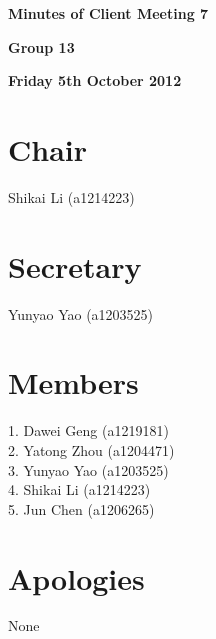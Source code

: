 \documentclass[11pt, a4paper]{article}
\begin{document}
 



\vspace*{15pt}

\begin{center}
\huge \bf Minutes of Client Meeting 7
\end{center}


\begin{center}
\Large \bf Group 13
\end{center}

\begin{center}
\Large \bf Friday 5th October 2012
\end{center}

\section*{Chair}
Shikai Li (a1214223)

\section*{Secretary}
Yunyao Yao (a1203525)

\section*{Members}
1. Dawei Geng (a1219181)\\
2. Yatong Zhou (a1204471)\\
3. Yunyao Yao (a1203525)\\
4. Shikai Li (a1214223)\\
5. Jun Chen (a1206265)\\
\vspace*{10pt}

\section*{Apologies}
None
\end{document}
